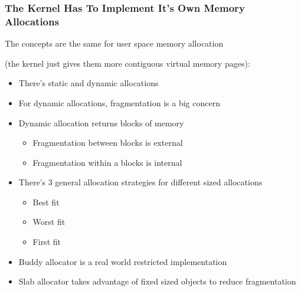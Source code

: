   \begin{frame}
    \frametitle{The Kernel Has To Implement It's Own Memory Allocations}

    The concepts are the same for user space memory allocation

    (the kernel just gives them more contiguous virtual memory pages):

    \begin{itemize}
      \item There's static and dynamic allocations
      \item For dynamic allocations, fragmentation is a big concern
      \item Dynamic allocation returns blocks of memory
        \begin{itemize}
          \item Fragmentation between blocks is external
          \item Fragmentation within a blocks is internal
        \end{itemize}
      \item There's 3 general allocation strategies for different sized
            allocations
        \begin{itemize}
          \item Best fit
          \item Worst fit
          \item First fit
        \end{itemize}
      \item Buddy allocator is a real world restricted implementation
      \item Slab allocator takes advantage of fixed sized objects to reduce
            fragmentation
    \end{itemize}
  \end{frame}

